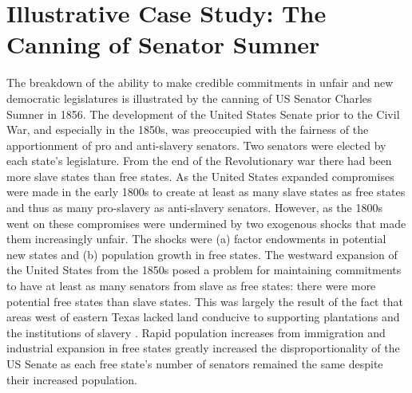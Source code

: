 \documentclass[a4paper]{article}\usepackage[]{graphicx}\usepackage[]{color}
\begin{document}
\section{Illustrative Case Study: The Canning of Senator Sumner}

The breakdown of the ability to make credible commitments in unfair and new democratic legislatures is illustrated by the canning of US Senator Charles Sumner in 1856. The development of the United States Senate prior to the Civil War, and especially in the 1850s, was preoccupied with the fairness of the apportionment of pro and anti-slavery senators. Two senators were elected by each state's legislature. From the end of the Revolutionary war there had been more slave states than free states. As the United States expanded compromises were made in the early 1800s to create at least as many slave states as free states and thus as many pro-slavery as anti-slavery senators. However, as the 1800s went on these compromises were undermined by two exogenous shocks that made them increasingly unfair. The shocks were (a) factor endowments in potential new states and (b) population growth in free states.  The westward expansion of the United States from the 1850s posed a problem for maintaining commitments to have at least as many senators from slave as free states: there were more potential free states than slave states. This was largely the result of the fact that areas west of eastern Texas lacked land conducive to supporting plantations and the institutions of slavery \cite[see][]{Ramsdell1929,Sokoloff2000}. Rapid population increases from immigration and industrial expansion in free states greatly increased the disproportionality of the US Senate as each free state's number of senators remained the same despite their increased population.
\end{document}

